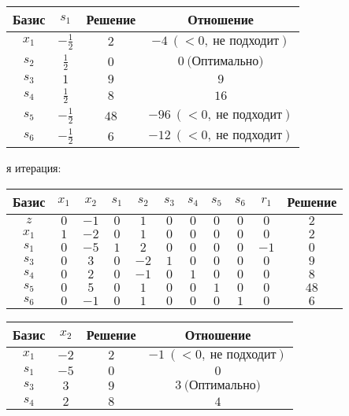 \documentclass{article}%
\begin{document}
\begin{flushleft}
\begin{tabular}{|cccc|}%
\hline%
Базис&$s_{1}$&Решение&Отношение\\%
\hline%
$x_{1}$&$-\frac{1}{2}$&$2$&$-4\: (< 0, \: \text{не подходит})$\\%
$s_{2}$&$\frac{1}{2}$&$0$&$0\: \text{(Оптимально)}$\\%
$s_{3}$&$1$&$9$&$9$\\%
$s_{4}$&$\frac{1}{2}$&$8$&$16$\\%
$s_{5}$&$-\frac{1}{2}$&$48$&$-96\: (< 0, \: \text{не подходит})$\\%
$s_{6}$&$-\frac{1}{2}$&$6$&$-12\: (< 0, \: \text{не подходит})$\\%
\hline%
\end{tabular}%
\newline%
\newline%
я итерация: %
\newline%
\newline%
\renewcommand{\arraystretch}{1.3}%
\begin{tabular}{|c|ccccccccc|c|}%
\hline%
Базис&$x_{1}$&$x_{2}$&$s_{1}$&$s_{2}$&$s_{3}$&$s_{4}$&$s_{5}$&$s_{6}$&$r_{1}$&Решение\\%
\hline%
$z$&$0$&$-1$&$0$&$1$&$0$&$0$&$0$&$0$&$0$&$2$\\%
\hline%
$x_{1}$&$1$&$-2$&$0$&$1$&$0$&$0$&$0$&$0$&$0$&$2$\\%
$s_{1}$&$0$&$-5$&$1$&$2$&$0$&$0$&$0$&$0$&$-1$&$0$\\%
$s_{3}$&$0$&$3$&$0$&$-2$&$1$&$0$&$0$&$0$&$0$&$9$\\%
$s_{4}$&$0$&$2$&$0$&$-1$&$0$&$1$&$0$&$0$&$0$&$8$\\%
$s_{5}$&$0$&$5$&$0$&$1$&$0$&$0$&$1$&$0$&$0$&$48$\\%
$s_{6}$&$0$&$-1$&$0$&$1$&$0$&$0$&$0$&$1$&$0$&$6$\\%
\hline%
\end{tabular}%
\newline%
\newline%
\newline%
\begin{tabular}{|cccc|}%
\hline%
Базис&$x_{2}$&Решение&Отношение\\%
\hline%
$x_{1}$&$-2$&$2$&$-1\: (< 0, \: \text{не подходит})$\\%
$s_{1}$&$-5$&$0$&$0$\\%
$s_{3}$&$3$&$9$&$3\: \text{(Оптимально)}$\\%
$s_{4}$&$2$&$8$&$4$\\%

\end{tabular}
\end{flushleft}
\end{document}
